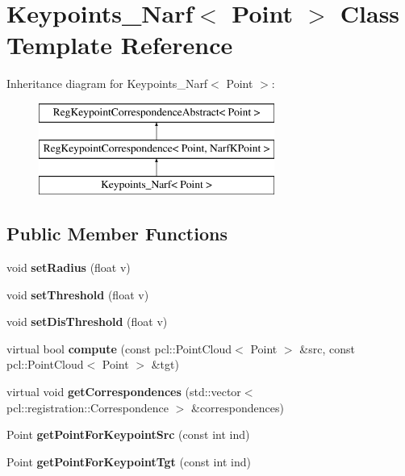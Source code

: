 \hypertarget{classKeypoints__Narf}{
\section{Keypoints\_\-Narf$<$ Point $>$ Class Template Reference}
\label{classKeypoints__Narf}
}
Inheritance diagram for Keypoints\_\-Narf$<$ Point $>$:\begin{figure}[H]
\begin{center}
\leavevmode
\includegraphics[height=3.000000cm]{classKeypoints__Narf}
\end{center}
\end{figure}
\subsection*{Public Member Functions}
\begin{DoxyCompactItemize}
\item 
\hypertarget{classKeypoints__Narf_a43abbb08515b95bab17c0da74e6f8575}{
void {\bfseries setRadius} (float v)}
\label{classKeypoints__Narf_a43abbb08515b95bab17c0da74e6f8575}

\item 
\hypertarget{classKeypoints__Narf_aa52165facc800efa865888b608c7a558}{
void {\bfseries setThreshold} (float v)}
\label{classKeypoints__Narf_aa52165facc800efa865888b608c7a558}

\item 
\hypertarget{classKeypoints__Narf_a7476a84609be6d463d32234576387863}{
void {\bfseries setDisThreshold} (float v)}
\label{classKeypoints__Narf_a7476a84609be6d463d32234576387863}

\item 
\hypertarget{classKeypoints__Narf_a156b9ccd8faae2612e57a92163bf416c}{
virtual bool {\bfseries compute} (const pcl::PointCloud$<$ Point $>$ \&src, const pcl::PointCloud$<$ Point $>$ \&tgt)}
\label{classKeypoints__Narf_a156b9ccd8faae2612e57a92163bf416c}

\item 
\hypertarget{classKeypoints__Narf_aa975bf558ca1d1e5a7f0ebeca2cfb309}{
virtual void {\bfseries getCorrespondences} (std::vector$<$ pcl::registration::Correspondence $>$ \&correspondences)}
\label{classKeypoints__Narf_aa975bf558ca1d1e5a7f0ebeca2cfb309}

\item 
\hypertarget{classKeypoints__Narf_a7e02a9e934786fa9c16f686b6dda77c6}{
Point {\bfseries getPointForKeypointSrc} (const int ind)}
\label{classKeypoints__Narf_a7e02a9e934786fa9c16f686b6dda77c6}

\item 
\hypertarget{classKeypoints__Narf_a3c1880248904e955009daf55314c3fa7}{
Point {\bfseries getPointForKeypointTgt} (const int ind)}
\label{classKeypoints__Narf_a3c1880248904e955009daf55314c3fa7}

\end{DoxyCompactItemize}
